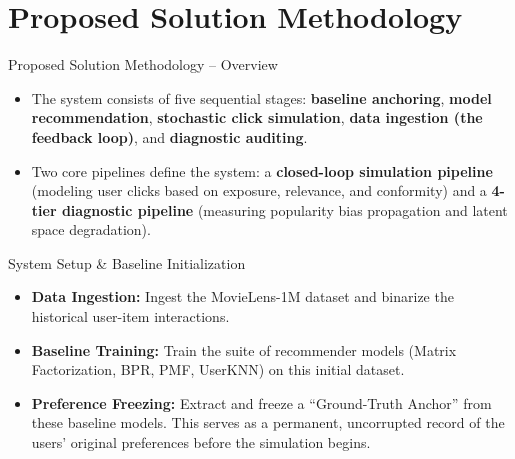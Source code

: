 \documentclass[11pt,aspectratio=43,xcolor=table]{beamer}
\begin{document}
\section{Proposed Solution Methodology}

\begin{frame}{Proposed Solution Methodology -- Overview}
  \begin{itemize}
      \item The system consists of five sequential stages: \textbf{baseline anchoring}, \textbf{model recommendation}, \textbf{stochastic click simulation}, \textbf{data ingestion (the feedback loop)}, and \textbf{diagnostic auditing}.
      \vspace{0.5cm}
      \item Two core pipelines define the system: a \textbf{closed-loop simulation pipeline} (modeling user clicks based on exposure, relevance, and conformity) and a \textbf{4-tier diagnostic pipeline} (measuring popularity bias propagation and latent space degradation).
  \end{itemize}
\end{frame}

\begin{frame}{System Setup \& Baseline Initialization}
    \begin{itemize}
        \item \textbf{Data Ingestion:} Ingest the MovieLens-1M dataset and binarize the historical user-item interactions.
        \item \textbf{Baseline Training:} Train the suite of recommender models (Matrix Factorization, BPR, PMF, UserKNN) on this initial dataset.
        \item \textbf{Preference Freezing:} Extract and freeze a ``Ground-Truth Anchor'' from these baseline models. This serves as a permanent, uncorrupted record of the users' original preferences before the simulation begins.
    \end{itemize}
\end{frame}
\end{document}
